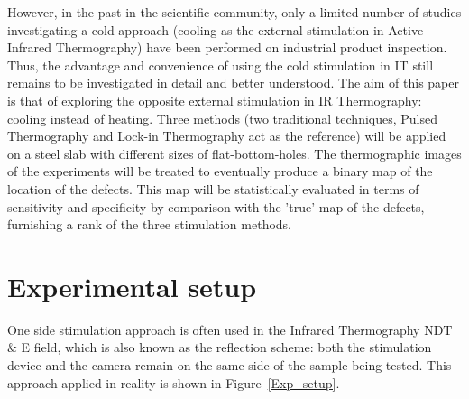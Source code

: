 \documentclass[]{spie}  %
\begin{document}
However, in the past in the scientific community, only a limited number of studies investigating a cold approach (cooling as the external stimulation in Active Infrared Thermography) have been performed on industrial product inspection\cite{endohdynamical2012,2012-LewisHom,Lei2016detection}. Thus, the advantage and convenience of using the cold stimulation in IT still remains to be investigated in detail and better understood. The aim of this paper is that of exploring the opposite external stimulation in IR Thermography: cooling instead of heating. Three methods (two traditional techniques, Pulsed Thermography and Lock-in Thermography act as the reference) will be applied on a steel slab with different sizes of flat-bottom-holes. The thermographic images of the experiments will be  treated to  eventually produce a binary map of the location of the defects. This map will be statistically evaluated in terms of sensitivity and specificity\cite{Fawcett2006} by comparison with the ’true’ map of the defects, furnishing a rank of the three stimulation methods. 



\section{Experimental setup} %
\label{sec:experimental_setup}
One side stimulation approach is often used in the Infrared Thermography NDT \& E field, which is also known as the reflection scheme: both the stimulation device and the camera remain on the same side of the sample being tested. This approach applied in reality is shown in Figure~\ref{Exp_setup}.
\end{document}
